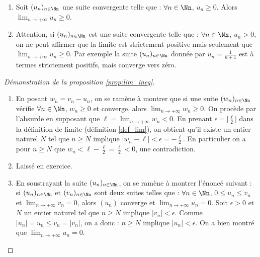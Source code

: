 \documentclass[class=report,crop=false]{standalone}
\begin{document}
\begin{remarque*}
\sauteligne
  \begin{enumerate}
    \item Soit $(u_n)_{n\in \Nn}$ une suite convergente telle que :
$\forall n \in \Nn$, $u_n\geq 0$. Alors $\lim_{n\to +\infty} u_n\geq 0$.
    \item Attention, si $(u_n)_{n\in \Nn}$ est une suite convergente telle que :
$\forall n \in \Nn$, $u_n > 0$, on ne peut affirmer que la limite est strictement positive mais
seulement que $\lim_{n\to +\infty} u_n \ge 0$.
Par exemple la suite $(u_n)_{n\in \Nn}$ donnée par $u_n=\frac{1}{n+1} $ est à termes strictement positifs, mais converge vers zéro.


  \end{enumerate}
\end{remarque*}

\begin{proof}[Démonstration de la proposition \ref{prop:lim_ineg}]
~
  \begin{enumerate}
    \item En posant $w_n=v_n-u_n$, on se ramène à montrer que si une
suite $(w_n)_{n\in \Nn}$ vérifie $\forall n \in \Nn$, $w_n\geq 0$ et converge,
alors $\lim_{n\to +\infty} w_n\geq 0$. On procède par l'absurde en supposant
que $\ell=\lim_{n\to +\infty} w_n <0$. En prenant $\epsilon=\lvert\frac{\ell}{2}  \rvert $
dans la définition de limite (définition \ref{def_lim}), on obtient qu'il existe
un entier naturel $N$ tel que $n\geq N$ implique $ \lvert w_n - \ell  \rvert <  \epsilon=-\frac{\ell}{2}$.
En particulier on a pour $n\geq N$ que $w_n< \ell-\frac{\ell}{2}=\frac{\ell}{2}<0$, une contradiction.

    \item Laissé en exercice.

    \item En soustrayant la suite $(u_n)_{n\in \Nn}$, on se ramène à
montrer l'énoncé suivant : si  $(u_n)_{n\in \Nn}$ et $(v_n)_{n\in \Nn}$ sont deux
suites telles que : $\forall n \in \Nn$, $0\leq u_n\leq v_n$ et $\lim_{n\to +\infty} v_n= 0$,
alors $(u_n)$ converge et $\lim_{n\to +\infty} u_n= 0$. Soit $\epsilon >0$ et $N$ un entier naturel
tel que $n\geq N$ implique $\lvert v_n \rvert <\epsilon$. Comme
$\lvert u_n \rvert=u_n\leq v_n=\lvert v_n \rvert$, on a donc : $n\geq N$ implique
$\lvert u_n \rvert <\epsilon$. On a bien montré que $\lim_{n\to +\infty} u_n= 0$.

  \end{enumerate}
\end{proof}
\end{document}
